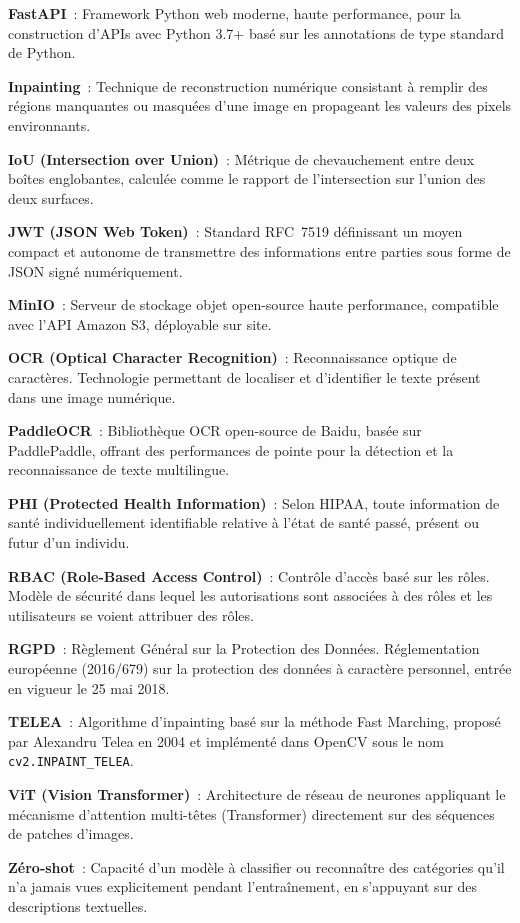 \textbf{FastAPI}~: Framework Python web moderne, haute performance, pour la construction d'APIs avec Python 3.7+ basé sur les annotations de type standard de Python.

\textbf{Inpainting}~: Technique de reconstruction numérique consistant à remplir des régions manquantes ou masquées d'une image en propageant les valeurs des pixels environnants.

\textbf{IoU (Intersection over Union)}~: Métrique de chevauchement entre deux boîtes englobantes, calculée comme le rapport de l'intersection sur l'union des deux surfaces.

\textbf{JWT (JSON Web Token)}~: Standard RFC~7519 définissant un moyen compact et autonome de transmettre des informations entre parties sous forme de JSON signé numériquement.

\textbf{MinIO}~: Serveur de stockage objet open-source haute performance, compatible avec l'API Amazon S3, déployable sur site.

\textbf{OCR (Optical Character Recognition)}~: Reconnaissance optique de caractères. Technologie permettant de localiser et d'identifier le texte présent dans une image numérique.

\textbf{PaddleOCR}~: Bibliothèque OCR open-source de Baidu, basée sur PaddlePaddle, offrant des performances de pointe pour la détection et la reconnaissance de texte multilingue.

\textbf{PHI (Protected Health Information)}~: Selon HIPAA, toute information de santé individuellement identifiable relative à l'état de santé passé, présent ou futur d'un individu.

\textbf{RBAC (Role-Based Access Control)}~: Contrôle d'accès basé sur les rôles. Modèle de sécurité dans lequel les autorisations sont associées à des rôles et les utilisateurs se voient attribuer des rôles.

\textbf{RGPD}~: Règlement Général sur la Protection des Données. Réglementation européenne (2016/679) sur la protection des données à caractère personnel, entrée en vigueur le 25 mai 2018.

\textbf{TELEA}~: Algorithme d'inpainting basé sur la méthode Fast Marching, proposé par Alexandru Telea en 2004 et implémenté dans OpenCV sous le nom \texttt{cv2.INPAINT\_TELEA}.

\textbf{ViT (Vision Transformer)}~: Architecture de réseau de neurones appliquant le mécanisme d'attention multi-têtes (Transformer) directement sur des séquences de patches d'images.

\textbf{Zéro-shot}~: Capacité d'un modèle à classifier ou reconnaître des catégories qu'il n'a jamais vues explicitement pendant l'entraînement, en s'appuyant sur des descriptions textuelles.
